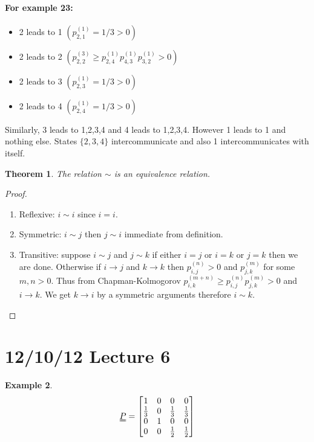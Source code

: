 \documentclass{article}
\newtheorem{thm}{Theorem}
\theoremstyle{definition}
\newtheorem{ex}[thm]{Example}
\begin{document}
\paragraph*{For example 23:}

\begin{itemize}
\item
2 leads to 1 $(p_{2,1}^{(1)} = 1/3 > 0)$
\item
2 leads to 2 $(p_{2,2}^{(3)} \geq p_{2,4}^(1)p_{4,3}^{(1)}p_{3,2}^{(1)} > 0)$
\item
2 leads to 3 $(p_{2,3}^{(1)} = 1/3 > 0)$
\item
2 leads to 4 $(p_{2,4}^{(1)} = 1/3 > 0)$
\end{itemize}

Similarly, 3 leads to 1,2,3,4 and 4 leads to 1,2,3,4. However 1 leads to 1 and nothing else. States $\{2,3,4\}$ intercommunicate and also 1 intercommunicates with itself.

\begin{thm} The relation $\sim$ is an equivalence relation. \end{thm}

\begin{proof}
\begin{enumerate}
\item
Reflexive: $i \sim i$ since $i=i$.
\item
Symmetric: $i \sim j$ then $j \sim i$ immediate from definition.
\item
Transitive: suppose $i \sim j$ and $j \sim k$ if either $i=j$ or $i=k$ or $j=k$ then we are done. Otherwise if $i \rightarrow j$ and $k \rightarrow k$ then $p_{i,j}^{(n)} > 0$ and $p_{j,k}^{(m)}$ for some $m,n > 0$. Thus from Chapman-Kolmogorov  $p_{i,k}^{(m+n)} \geq p_{i,j}^{(n)}p_{j,k}^{(m)}>0$ and $i \rightarrow k$. We get $k \rightarrow i$ by a symmetric arguments therefore $i \sim k$.
\end{enumerate}
\end{proof}

\section{12/10/12 Lecture 6}
\begin{ex}
$$\uuline{P} = \begin{bmatrix}
1 & 0 & 0 & 0 \\
\frac13 & 0 & \frac13 & \frac13 \\
0 & 1 & 0 & 0 \\
0 & 0 & \frac12 & \frac12 \\
\end{bmatrix}$$
\end{ex}
\end{document}
